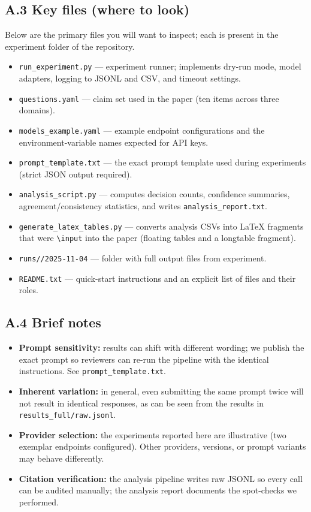 \documentclass[12pt]{article}
\begin{document}
\subsection*{A.3 Key files (where to look)}
Below are the primary files you will want to inspect; each is present in the experiment folder of the repository.
\begin{itemize}
  \item \texttt{run\_experiment.py} — experiment runner; implements dry-run mode, model adapters, logging to JSONL and CSV, and timeout settings.
  \item \texttt{questions.yaml} — claim set used in the paper (ten items across three domains).
  \item \texttt{models\_example.yaml} — example endpoint configurations and the environment-variable names expected for API keys.
  \item \texttt{prompt\_template.txt} — the exact prompt template used during experiments (strict JSON output required).
  \item \texttt{analysis\_script.py} — computes decision counts, confidence summaries, agreement/consistency statistics, and writes \texttt{analysis\_report.txt}.
  \item \texttt{generate\_latex\_tables.py} — converts analysis CSVs into LaTeX fragments that were \texttt{\textbackslash input} into the paper (floating tables and a longtable fragment).
  \item \texttt{runs//2025-11-04} — folder with full output files from experiment.
  \item \texttt{README.txt} — quick-start instructions and an explicit list of files and their roles.
\end{itemize}

\subsection*{A.4 Brief notes}
\begin{itemize}
  \item \textbf{Prompt sensitivity:} results can shift with different wording; we publish the exact prompt so reviewers can re-run the pipeline with the identical instructions. See \texttt{prompt\_template.txt}.
  \item \textbf{Inherent variation:} in general, even submitting the same prompt twice will not result in identical responses, as can be seen from the results in \texttt{results\_full/raw.jsonl}.
  \item \textbf{Provider selection:} the experiments reported here are illustrative (two exemplar endpoints configured). Other providers, versions, or prompt variants may behave differently.
  \item \textbf{Citation verification:} the analysis pipeline writes raw JSONL so every call can be audited manually; the analysis report documents the spot-checks we performed.
\end{itemize}



\end{document}
